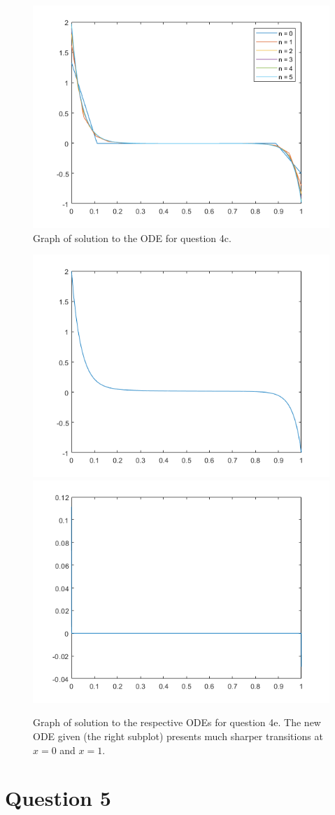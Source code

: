 \documentclass{article}
\begin{document}
\begin{figure}[!htp]
    \begin{center}
        \includegraphics*[width=0.5\linewidth]{q4c.png}
        \caption{Graph of solution to the ODE for question 4c.}
    \end{center}
\end{figure}
\begin{figure}[!htp]
    \begin{center}
        \includegraphics*[width=0.49\linewidth]{q4e1.png}
        \includegraphics*[width=0.49\linewidth]{q4e2.png}
        \caption{Graph of solution to the respective ODEs for question 4e. The new  ODE given (the right subplot) presents much sharper transitions at $x = 0$ and $x = 1$.}
        \label{fig:4e}
    \end{center}
\end{figure}\newpage

\section*{Question 5}


\end{document}
